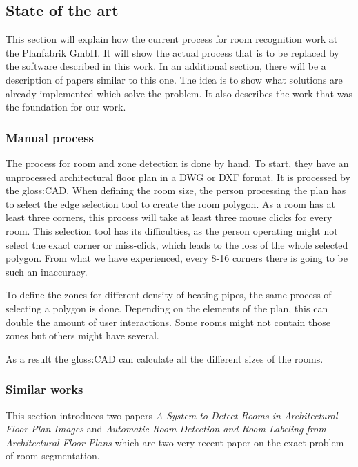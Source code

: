 \subsection{State of the art}
This section will explain how the current process for room recognition work at the Planfabrik GmbH. It will show the actual process that is to be replaced by the software described in this work. In an additional section, there will be a description of papers similar to this one. The idea is to show what solutions are already implemented which solve the problem. It also describes the work that was the foundation for our work.

\subsubsection{Manual process}
 The process for room and zone detection is done by hand. To start, they have an unprocessed architectural floor plan in a DWG or DXF format. It is processed by the \gls{gloss:CAD}. When defining the room size, the person processing the plan has to select the edge selection tool to create the room polygon. As a room has at least three corners, this process will take at least three mouse clicks for every room. This selection tool has its difficulties, as the person operating might not select the exact corner or miss-click, which leads to the loss of the whole selected polygon. From what we have experienced, every 8-16 corners there is going to be such an inaccuracy.
 
 To define the zones for different density of heating pipes, the same process of selecting a polygon is done. Depending on the elements of the plan, this can double the amount of user interactions. Some rooms might not contain those zones but others might have several.
 
 As a result the \gls{gloss:CAD} can calculate all the different sizes of the rooms.
 
\subsubsection{Similar works}
\label{sub:SimilarWorks}
This section introduces two papers \textit{A System to Detect Rooms in Architectural Floor Plan Images} \citep{mace_valveny_loctea_tabbone_2010} and \textit{Automatic Room Detection and Room Labeling from Architectural Floor Plans} \citep{ahmed_liwicki_weber_dengel_2012} which are two very recent paper on the exact problem of room segmentation. 

